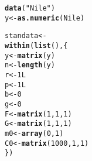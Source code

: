 \documentclass{article}\usepackage[]{graphicx}\usepackage[]{color}
\makeatletter
\newcommand{\hlnum}[1]{\textcolor[rgb]{0.686,0.059,0.569}{#1}}%
\newcommand{\hlstr}[1]{\textcolor[rgb]{0.192,0.494,0.8}{#1}}%
\newcommand{\hlstd}[1]{\textcolor[rgb]{0.345,0.345,0.345}{#1}}%
\newcommand{\hlkwb}[1]{\textcolor[rgb]{0.69,0.353,0.396}{#1}}%
\newcommand{\hlkwd}[1]{\textcolor[rgb]{0.737,0.353,0.396}{\textbf{#1}}}%
\newenvironment{kframe}{%
 \def\at@end@of@kframe{}%
 \ifinner\ifhmode%
  \def\at@end@of@kframe{\end{minipage}}%
  \begin{minipage}{\columnwidth}%
 \fi\fi%
 \def\FrameCommand##1{\hskip\@totalleftmargin \hskip-\fboxsep
 \colorbox{shadecolor}{##1}\hskip-\fboxsep
     \hskip-\linewidth \hskip-\@totalleftmargin \hskip\columnwidth}%
 \MakeFramed {\advance\hsize-\width
   \@totalleftmargin\z@ \linewidth\hsize
   \@setminipage}}%
 {\par\unskip\endMakeFramed%
 \at@end@of@kframe}
\newenvironment{knitrout}{}{} %
\makeatother
\begin{document}
\begin{knitrout}
\color{fgcolor}\begin{kframe}
\begin{alltt}
\hlkwd{data}\hlstd{(}\hlstr{"Nile"}\hlstd{)}
\hlstd{y} \hlkwb{<-} \hlkwd{as.numeric}\hlstd{(Nile)}

\hlstd{standata} \hlkwb{<-}
    \hlkwd{within}\hlstd{(}\hlkwd{list}\hlstd{(), \{}
        \hlstd{y} \hlkwb{<-} \hlkwd{matrix}\hlstd{(y)}
        \hlstd{n} \hlkwb{<-} \hlkwd{length}\hlstd{(y)}
        \hlstd{r} \hlkwb{<-} \hlnum{1L}
        \hlstd{p} \hlkwb{<-} \hlnum{1L}
        \hlstd{b} \hlkwb{<-} \hlnum{0}
        \hlstd{g} \hlkwb{<-} \hlnum{0}
        \hlstd{F} \hlkwb{<-} \hlkwd{matrix}\hlstd{(}\hlnum{1}\hlstd{,} \hlnum{1}\hlstd{,} \hlnum{1}\hlstd{)}
        \hlstd{G} \hlkwb{<-} \hlkwd{matrix}\hlstd{(}\hlnum{1}\hlstd{,} \hlnum{1}\hlstd{,} \hlnum{1}\hlstd{)}
        \hlstd{m0} \hlkwb{<-} \hlkwd{array}\hlstd{(}\hlnum{0}\hlstd{,} \hlnum{1}\hlstd{)}
        \hlstd{C0} \hlkwb{<-} \hlkwd{matrix}\hlstd{(}\hlnum{1000}\hlstd{,} \hlnum{1}\hlstd{,} \hlnum{1}\hlstd{)}
        \hlstd{\})}


\end{alltt}
\end{kframe}
\end{knitrout}
\end{document}
